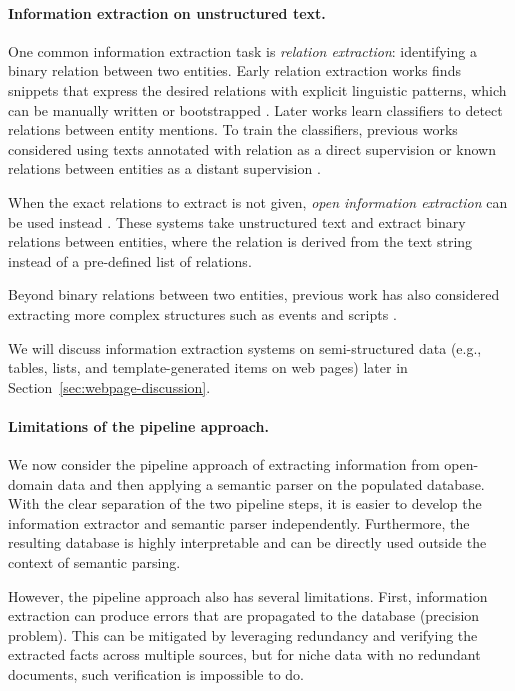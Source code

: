 \paragraph{Information extraction on unstructured text.}

One common information extraction task is \emph{relation extraction}:
identifying a binary relation between two entities.
Early relation extraction works finds snippets that express
the desired relations with explicit
linguistic patterns, which can be manually written or bootstrapped
\cite{hearst1992automatic,hearst1998automated,agichtein2000snowball}.
Later works learn classifiers to detect relations between entity mentions.
To train the classifiers, previous works considered using
texts annotated with relation as a direct supervision
\cite{zeng2014relation,miwa2016end}
or known relations between entities as a distant supervision
\cite{mintz2009distant,riedel2010modeling}.

When the exact relations to extract is not given,
\emph{open information extraction} can be used instead
\cite{banko2007open,fader11reverb,etzioni11openie,masaum2012open,mitchell2015nell}.
These systems take unstructured text and extract
binary relations between entities,
where the relation is derived from the text string
instead of a pre-defined list of relations.

Beyond binary relations between two entities,
previous work has also considered extracting more complex structures
such as events
\cite{riedel2011robust,li2013joint,chen2015event}
and scripts
\citex.

We will discuss information extraction systems on semi-structured data
(e.g., tables, lists, and template-generated items on web pages)
later in Section~\ref{sec:webpage-discussion}.

\paragraph{Limitations of the pipeline approach.}

We now consider the pipeline approach of
extracting information from open-domain data and then
applying a semantic parser on the populated database.
With the clear separation of the two pipeline steps,
it is easier to develop the information extractor and
semantic parser independently.
Furthermore, the resulting database is highly interpretable
and can be directly used outside the context of semantic parsing.

However, the pipeline approach also has several limitations.
First, information extraction
can produce errors that are propagated to the database
(precision problem).
This can be mitigated by leveraging redundancy
and verifying the extracted facts across multiple sources,
but for niche data with no redundant documents,
such verification is impossible to do.

